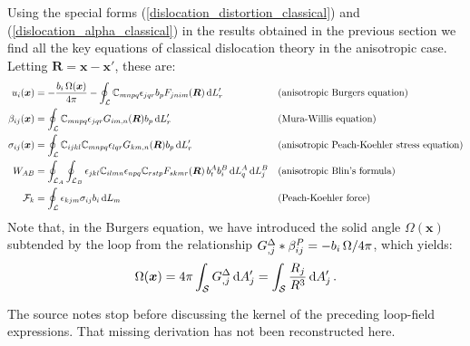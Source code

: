 Using the special forms (\ref{dislocation_distortion_classical}) and (\ref{dislocation_alpha_classical}) in the results obtained in the previous section we find all the key equations of classical dislocation theory in the anisotropic case. Letting $\bm R=\bm x-\bm x'$, these are:
\begin{subequations}
\begin{align}
u_i(\bm x)
&=-\frac{b_i\, \Omega(\bm
  x)}{4\pi}-\oint_{\mathcal{L}}\mathbb{C}_{mnpq}\epsilon_{jqr}b_pF_{jnim}(\bm
R)\,\text{d}L_r' && \text{(anisotropic Burgers equation)}\\
\beta_{ij}(\bm x)&=\oint_{\mathcal{L}}\mathbb{C}_{mnpq}\epsilon_{jqr}G_{im,n}(\bm R)b_p\,\text{d}L_r' && \text{(Mura-Willis equation)}\\
\sigma_{ij}(\bm
x)&=\oint_{\mathcal{L}}\mathbb{C}_{ijkl}\mathbb{C}_{mnpq}\epsilon_{lqr}G_{km,n}(\bm
R)b_p\,\text{d}L_r' && \text{(anisotropic Peach-Koehler stress equation)}\label{classicaCauchyStress}\\
W_{AB}&=\oint_{\mathcal{L}_A}\oint_{\mathcal{L}_B}\epsilon_{jkl}\mathbb{C}_{ilmn}\epsilon_{npq}\mathbb{C}_{rstp}F_{skmr}(\bm R)\, b^{A}_{t} b^{B}_{i} \,\text{d}L^A_{q}\,\text{d}L^B_{j}&&\text{(anisotropic Blin's formula) }\\
\mathcal{F}_k&=\oint_\mathcal{L}\epsilon_{kjm}\sigma_{ij}b_i\,\text{d}L_m&&\text{(Peach-Koehler force)}
\end{align}
\label{class_aniso_all}
\end{subequations}
Note that, in the Burgers equation, we have introduced the solid angle  $\Omega(\bm x)$ subtended by the loop from the relationship  $G^\Delta_{,j}*\beta^P_{ij}=-{b_i\, \Omega}/{4\pi}$, which yields:
\begin{align}
\Omega(\bm x)=4\pi\int_\mathcal{S}G^\Delta_{,j}\,\text{d}A_j'=\int_\mathcal{S}\frac{R_j}{R^3}\,\text{d}A_j'\, .
\end{align}

\begin{draftnote}The source notes stop before discussing the kernel of the preceding loop-field expressions. That missing derivation has not been reconstructed here.\end{draftnote}





